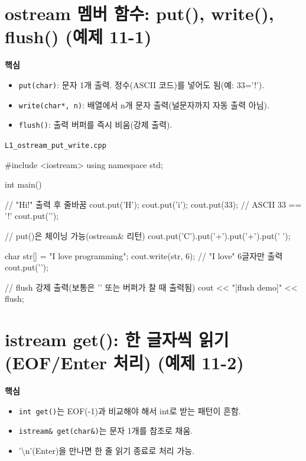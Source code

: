 \documentclass[11pt,a4paper]{article}
\newcommand{\filetag}[1]{\texttt{\color{Accent}#1}}
\begin{document}
\section{ostream 멤버 함수: put(), write(), flush() (예제 11-1)}
\begin{GoalBox}
\textbf{핵심}
\begin{itemize}[leftmargin=18pt]
  \item \texttt{put(char)}: 문자 1개 출력. 정수(ASCII 코드)를 넣어도 됨(예: 33='!'). %
  \item \texttt{write(char*, n)}: 배열에서 n개 문자 출력(널문자까지 자동 출력 아님). %
  \item \texttt{flush()}: 출력 버퍼를 즉시 비움(강제 출력). %
\end{itemize}
\end{GoalBox}

\noindent\filetag{L1\_ostream\_put\_write.cpp}
\begin{cppcode}
#include <iostream>
using namespace std;

int main() {
    // "Hi!" 출력 후 줄바꿈
    cout.put('H');
    cout.put('i');
    cout.put(33);     // ASCII 33 == '!'
    cout.put('\n');

    // put()은 체이닝 가능(ostream& 리턴)
    cout.put('C').put('+').put('+').put(' ');

    char str[] = "I love programming";
    cout.write(str, 6); // "I love" 6글자만 출력
    cout.put('\n');

    // flush 강제 출력(보통은 '\n' 또는 버퍼가 찰 때 출력됨)
    cout << "[flush demo]" << flush;
}
\end{cppcode}

\section{istream get(): 한 글자씩 읽기(EOF/Enter 처리) (예제 11-2)}
\begin{GoalBox}
\textbf{핵심}
\begin{itemize}[leftmargin=18pt]
  \item \texttt{int get()}는 EOF(-1)과 비교해야 해서 int로 받는 패턴이 흔함. %
  \item \texttt{istream\& get(char\&)}는 문자 1개를 참조로 채움.
  \item '\textbackslash n'(Enter)을 만나면 한 줄 읽기 종료로 처리 가능.
\end{itemize}
\end{GoalBox}
\end{document}

